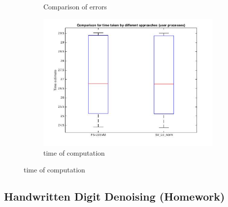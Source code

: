 \documentclass[11pt,oneside,a4paper]{article}
\begin{document}
\begin{figure}[H]
\begin{subfigure}[b]{0.4\textwidth}
		\caption{Comparison of errors}
	\end{subfigure}
		\begin{subfigure}[b]{0.4\textwidth}
			\includegraphics[width=\textwidth]{../Figures/time}
			\caption{time of computation}
		\end{subfigure}
\end{figure}

\subsection{Handwritten Digit Denoising (Homework)}
\end{document}
